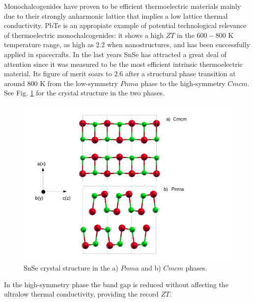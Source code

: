 Monochalcogenides have proven to be efficient thermoelectric materials\cite{heremans2008enhancement,zhang2013high,yang2008nanostructures,cho2011thermoelectric} mainly due to their strongly anharmonic lattice that implies a low 
lattice thermal conductivity\cite{delaire2011giant,li2014phonon,iizumi1975phase,o2017inelastic,ribeiro2018strong}. PbTe is an appropiate example of potential technological relevance of thermoelectric monochalcogenides: it shows 
a high $ZT$ in the $600-800$ K temperature range\cite{ravich2013semiconducting}, as high as $2.2$ when nanostructures\cite{hsu2004cubic}, and has been successfully applied in spacecrafts\cite{rowe2018thermoelectrics}. In the last 
years SnSe has attracted a great deal of attention since it was measured to be the most efficient intrinsic thermoelectric material\cite{zhao2014ultralow}. Its figure of merit soars to $2.6$ after a structural phase 
transition\cite{zhao2014ultralow,adouby1998structure,chattopadhyay1986neutron,von1981high,chatterji2018soft} at around $800$ K from the low-symmetry $Pnma$ phase to the high-symmetry $Cmcm$. See Fig. \ref{pnma-cmcm} for the crystal 
structure in the two phases.
\begin{figure}[h]
\begin{center}
\includegraphics[width=0.8\linewidth]{Figures/pnma-cmcm.pdf}
\caption{SnSe crystal structure in the a) $Pnma$ and b) $Cmcm$ phases.}
\label{pnma-cmcm}
\end{center}
\end{figure}
In the high-symmetry phase the band gap is reduced without affecting the ultralow thermal conductivity, providing the record $ZT$. \\

